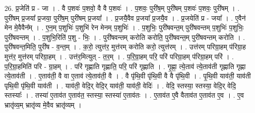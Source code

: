 \documentclass[17pt]{extarticle}
\begin{document}
26. प्र॒जेति॑ प्र - जा । . वै प॒शवः॑ प॒शवो॒ वै वै प॒शवः॑ । . प॒शवः॒ पुरी॑ष॒म् पुरी॑षम् प॒शवः॑ प॒शवः॒ पुरी॑षम् । . पुरी॑षम् प्र॒जया᳚ प्र॒जया॒ पुरी॑ष॒म् पुरी॑षम् प्र॒जया᳚ । . प्र॒जयै॒वैव प्र॒जया᳚ प्र॒जयै॒व । . प्र॒जयेति॑ प्र - जया᳚ । . ए॒वैन॑ मेन मे॒वैवैन᳚म् । . ए॒न॒म् प॒शुभिः॑ प॒शुभि॑ रेन मेनम् प॒शुभिः॑ । . प॒शुभिः॒ पुरी॑षवन्त॒म् पुरी॑षवन्तम् प॒शुभिः॑ प॒शुभिः॒ पुरी॑षवन्तम् । . प॒शुभि॒रिति॑ प॒शु - भिः॒ । . पुरी॑षवन्तम् करोति करोति॒ पुरी॑षवन्त॒म् पुरी॑षवन्तम् करोति । . पुरी॑षवन्त॒मिति॒ पुरी॑ष - व॒न्त॒म् । . क॒रो॒ त्युत्त॑र॒ मुत्त॑रम् करोति करो॒ त्युत्त॑रम् । . उत्त॑रम् परिग्रा॒हम् प॑रिग्रा॒ह मुत्त॑र॒ मुत्त॑रम् परिग्रा॒हम् । . उत्त॑र॒मित्युत् - त॒र॒म् । . प॒रि॒ग्रा॒हम् परि॒ परि॑ परिग्रा॒हम् प॑रिग्रा॒हम् परि॑ । . प॒रि॒ग्रा॒हमिति॑ परि - ग्रा॒हम् । . परि॑ गृह्णाति गृह्णाति॒ परि॒ परि॑ गृह्णाति । . गृ॒ह्णा॒ त्ये॒ताव॑ त्ये॒ताव॑ती गृह्णाति गृह्णा त्ये॒ताव॑ती । . ए॒ताव॑ती॒ वै वा ए॒ताव॑ त्ये॒ताव॑ती॒ वै । . वै पृ॑थि॒वी पृ॑थि॒वी वै वै पृ॑थि॒वी । . पृ॒थि॒वी याव॑ती॒ याव॑ती पृथि॒वी पृ॑थि॒वी याव॑ती । . याव॑ती॒ वेदि॒र् वेदि॒र् याव॑ती॒ याव॑ती॒ वेदिः॑ । . वेदि॒ स्तस्या॒ स्तस्या॒ वेदि॒र् वेदि॒ स्तस्याः᳚ । . तस्या॑ ए॒ताव॑त ए॒ताव॑त॒ स्तस्या॒ स्तस्या॑ ए॒ताव॑तः । . ए॒ताव॑त ए॒वै वैताव॑त ए॒ताव॑त ए॒व । . ए॒व भ्रातृ॑व्य॒म् भ्रातृ॑व्य मे॒वैव भ्रातृ॑व्यम् । \newline
\end{document}

